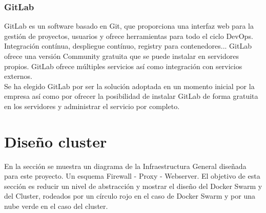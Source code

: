 		\subsubsection{GitLab}
			\begin{paragraph}
				GitLab es un software basado en Git, que proporciona una interfaz web para la gestión de proyectos, usuarios y ofrece herramientas para todo el ciclo DevOps. Integración contínua, despliegue contínuo, registry para contenedores... GitLab ofrece una versión Community gratuita que se puede instalar en servidores propios. GitLab ofrece múltiples servicios así como integración con servicios externos. \\
				Se ha elegido GitLab por ser la solución adoptada en un momento inicial por la empresa así como por ofrecer la posibilidad de instalar GitLab de forma gratuita en los servidores y administrar el servicio por completo. 
			\end{paragraph}
		
\section{Diseño cluster}
	\begin{paragraph}
		En la sección  se muestra un diagrama de la Infraestructura General diseñada para este proyecto. Un esquema Firewall - Proxy - Webserver. El objetivo de esta sección es reducir un nivel de abstracción y mostrar el diseño del Docker Swarm y del Cluster, rodeados por un círculo rojo en el caso de Docker Swarm y por una nube verde en el caso del cluster.
	\end{paragraph}
